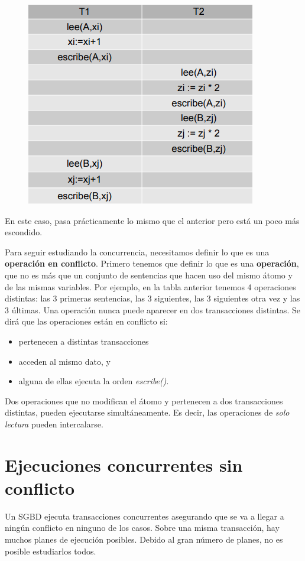 \begin{figure}[H]
  \center
  \includegraphics[scale=0.5]{img/24.png}
\end{figure}

En este caso, pasa prácticamente lo mismo que el anterior pero está un poco más escondido.

Para seguir estudiando la concurrencia, necesitamos definir lo que es una \textbf{operación en conflicto}. Primero tenemos que definir lo que es una \textbf{operación}, que no es más que un conjunto de sentencias que hacen uso del mismo átomo y de las mismas variables. Por ejemplo, en la tabla anterior tenemos 4 operaciones distintas: las 3 primeras sentencias, las 3 siguientes, las 3 siguientes otra vez y las 3 últimas. Una operación nunca puede aparecer en dos transacciones distintas. Se dirá que las operaciones están en conflicto si:
\begin{itemize}
\item pertenecen a distintas transacciones
\item acceden al mismo dato, y
\item alguna de ellas ejecuta la orden \textit{escribe()}.
\end{itemize}
Dos operaciones que no modifican el átomo y pertenecen a dos transacciones distintas, pueden ejecutarse simultáneamente. Es decir, las operaciones de \textit{solo lectura} pueden intercalarse.

\section{Ejecuciones concurrentes sin conflicto}

Un SGBD ejecuta transacciones concurrentes asegurando que se va a llegar a ningún conflicto en ninguno de los casos. Sobre una misma transacción, hay muchos planes de ejecución posibles. Debido al gran número de planes, no es posible estudiarlos todos.


